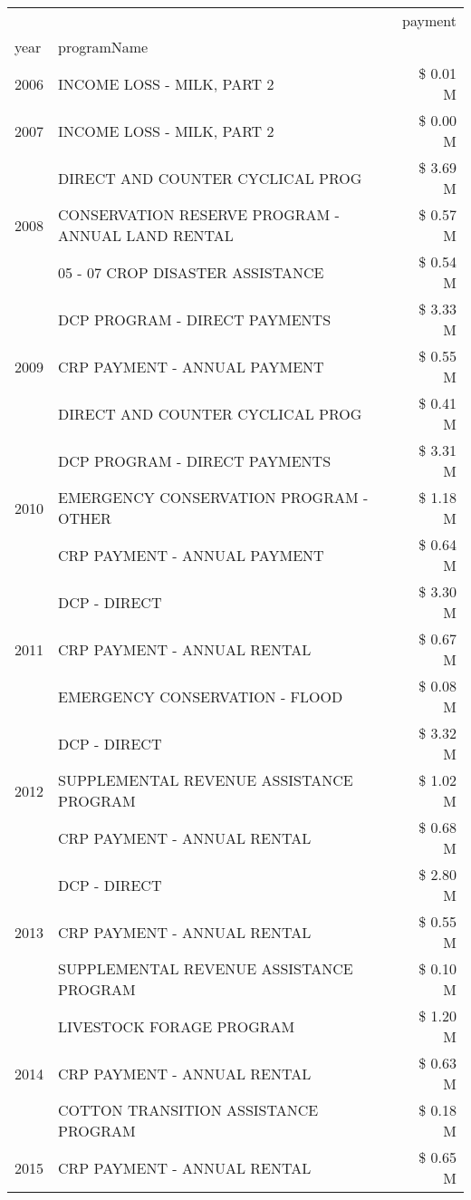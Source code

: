 \begin{tabular}{llr}
\toprule
 &  & payment \\
year & programName &  \\
\midrule
2006 & INCOME LOSS - MILK, PART 2 & \$ 0.01 M \\
\cline{1-3}
2007 & INCOME LOSS - MILK, PART 2 & \$ 0.00 M \\
\cline{1-3}
\multirow[t]{3}{*}{2008} & DIRECT AND COUNTER CYCLICAL PROG & \$ 3.69 M \\
 & CONSERVATION RESERVE PROGRAM - ANNUAL LAND RENTAL & \$ 0.57 M \\
 & 05 - 07 CROP DISASTER ASSISTANCE & \$ 0.54 M \\
\cline{1-3}
\multirow[t]{3}{*}{2009} & DCP PROGRAM - DIRECT PAYMENTS & \$ 3.33 M \\
 & CRP PAYMENT - ANNUAL PAYMENT & \$ 0.55 M \\
 & DIRECT AND COUNTER CYCLICAL PROG & \$ 0.41 M \\
\cline{1-3}
\multirow[t]{3}{*}{2010} & DCP PROGRAM - DIRECT PAYMENTS & \$ 3.31 M \\
 & EMERGENCY CONSERVATION PROGRAM - OTHER & \$ 1.18 M \\
 & CRP PAYMENT - ANNUAL PAYMENT & \$ 0.64 M \\
\cline{1-3}
\multirow[t]{3}{*}{2011} & DCP - DIRECT & \$ 3.30 M \\
 & CRP PAYMENT - ANNUAL RENTAL & \$ 0.67 M \\
 & EMERGENCY CONSERVATION - FLOOD & \$ 0.08 M \\
\cline{1-3}
\multirow[t]{3}{*}{2012} & DCP - DIRECT & \$ 3.32 M \\
 & SUPPLEMENTAL REVENUE ASSISTANCE PROGRAM & \$ 1.02 M \\
 & CRP PAYMENT - ANNUAL RENTAL & \$ 0.68 M \\
\cline{1-3}
\multirow[t]{3}{*}{2013} & DCP - DIRECT & \$ 2.80 M \\
 & CRP PAYMENT - ANNUAL RENTAL & \$ 0.55 M \\
 & SUPPLEMENTAL REVENUE ASSISTANCE PROGRAM & \$ 0.10 M \\
\cline{1-3}
\multirow[t]{3}{*}{2014} & LIVESTOCK FORAGE PROGRAM & \$ 1.20 M \\
 & CRP PAYMENT - ANNUAL RENTAL & \$ 0.63 M \\
 & COTTON TRANSITION ASSISTANCE PROGRAM & \$ 0.18 M \\
\cline{1-3}
\multirow[t]{3}{*}{2015} & CRP PAYMENT - ANNUAL RENTAL & \$ 0.65 M \\

\end{tabular}
